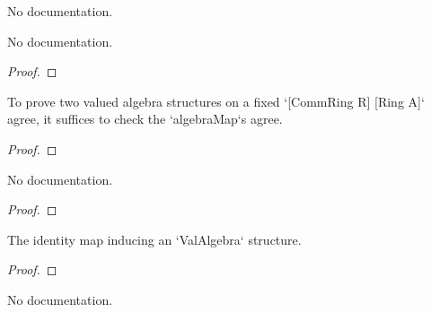 \begin{definition}\label{ValRingHom.toValAlgebra}
        \leanok
                No documentation.
    \end{definition}

\begin{theorem}\label{ValRingHom.valAlgebraMap_toValAlgebra}
        \leanok
                No documentation.
    \end{theorem}

\begin{proof}
    \leanok
\end{proof}

\begin{theorem}\label{ValAlgebra.valAlgebra_ext}
        \leanok
                To prove two valued algebra structures on a fixed `[CommRing R] [Ring A]` agree,
it suffices to check the `algebraMap`s agree.
    \end{theorem}

\begin{proof}
    \leanok
\end{proof}

\begin{theorem}\label{ValAlgebra.val_isEquiv_comap}
        \leanok
                No documentation.
    \end{theorem}

\begin{proof}
    \leanok
\end{proof}

\begin{theorem}\label{ValAlgebra.id.map_eq_id}
        \leanok
                The identity map inducing an `ValAlgebra` structure.
    \end{theorem}

\begin{proof}
    \leanok
\end{proof}

\begin{theorem}\label{ValAlgebra.id.map_eq_self}
        \leanok
                No documentation.
    \end{theorem}


